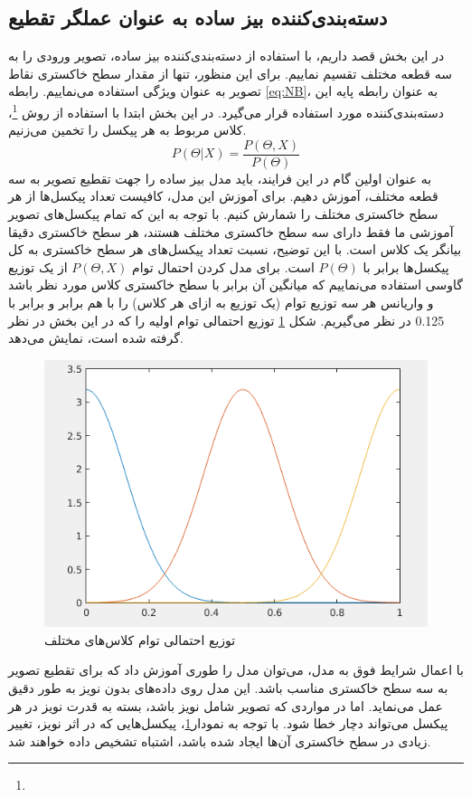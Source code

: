 \documentclass[11.5pt,a4paper]{article}
\begin{document}
\subsection{دسته‌بندی‌کننده بیز ساده به عنوان عملگر تقطیع}
در این بخش قصد داریم، با استفاده از دسته‌بندی‌کننده بیز ساده، تصویر ورودی را به سه قطعه مختلف تقسیم نماییم. برای این منظور، تنها از مقدار سطح خاکستری نقاط تصویر به عنوان ویژگی استفاده می‌نماییم. رابطه 
\ref{eq:NB}،
به عنوان رابطه پایه این دسته‌بندی‌کننده مورد استفاده قرار می‌گیرد. در این بخش ابتدا با استفاده از روش  \footnote{}، 
کلاس مربوط به هر پیکسل را تخمین می‌زنیم. 
\begin{equation}
\label{eq:NB}
P(\Theta | X) = \frac{ P(\Theta,X)}{P(\Theta)}
\end{equation}
به عنوان اولین گام در این فرایند،‌ باید مدل بیز ساده را جهت تقطیع تصویر به سه قطعه مختلف، آموزش دهیم. برای آموزش این مدل، کافیست تعداد پیکسل‌ها از هر سطح خاکستری مختلف را شمارش کنیم. با توجه به این‌ که تمام پیکسل‌های تصویر آموزشی ما فقط دارای سه سطح خاکستری مختلف هستند، هر سطح خاکستری دقیقا بیانگر یک کلاس است. با این توضیح، نسبت تعداد پیکسل‌های هر سطح خاکستری به کل پیکسل‌ها برابر با $P(\Theta)$ است. برای مدل کردن احتمال توام $P(\Theta,X)$ از یک توزیع گاوسی استفاده می‌نماییم که میانگین آن برابر با سطح خاکستری کلاس مورد نظر باشد و واریانس هر سه توزیع توام (یک توزیع به ازای هر کلاس) را با هم برابر و برابر با 0.125 در نظر می‌گیریم. شکل
\ref{fig:P0XL}
توزیع احتمالی توام اولیه را که در این بخش در نظر گرفته شده است، نمایش می‌دهد. 
\begin{figure}[h]
\center
\caption{توزیع احتمالی توام کلاس‌‌های مختلف}
\label{fig:P0XL}
\includegraphics[scale=0.5]{Imgs/P0XL}
\end{figure}
با اعمال شرایط فوق به مدل، می‌توان مدل را طوری آموزش داد که برای تقطیع تصویر به سه سطح خاکستری مناسب باشد. این مدل روی داده‌های بدون نویز به طور دقیق عمل می‌نماید. اما در مواردی که تصویر شامل نویز باشد، بسته به قدرت نویز در هر پیکسل می‌تواند دچار خطا شود. با توجه به نمودار\ref{fig:P0XL}، پیکسل‌هایی که در اثر نویز، تغییر زیادی در سطح خاکستری آن‌ها ایجاد شده باشد، اشتباه تشخیص داده‌‌ خواهند شد. 
\end{document}
